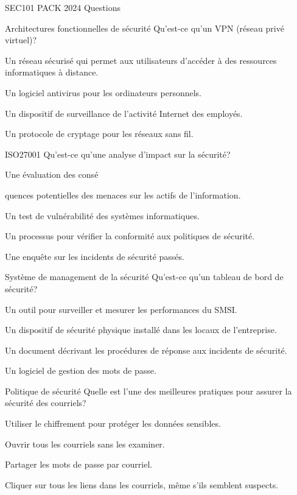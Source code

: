 \documentclass[12pt]{article}
\begin{document}
\begin{quiz}{SEC101 PACK 2024 Questions}
\begin{multi}[points=1]{Architectures fonctionnelles de sécurité}
Qu'est-ce qu'un VPN (réseau privé virtuel)?
\item* Un réseau sécurisé qui permet aux utilisateurs d'accéder à des ressources informatiques à distance.
\item Un logiciel antivirus pour les ordinateurs personnels.
\item Un dispositif de surveillance de l'activité Internet des employés.
\item Un protocole de cryptage pour les réseaux sans fil.
\end{multi}

\begin{multi}[points=1]{ISO27001}
Qu'est-ce qu'une analyse d'impact sur la sécurité?
\item* Une évaluation des consé

quences potentielles des menaces sur les actifs de l'information.
\item Un test de vulnérabilité des systèmes informatiques.
\item Un processus pour vérifier la conformité aux politiques de sécurité.
\item Une enquête sur les incidents de sécurité passés.
\end{multi}

\begin{multi}[points=1]{Système de management de la sécurité}
Qu'est-ce qu'un tableau de bord de sécurité?
\item* Un outil pour surveiller et mesurer les performances du SMSI.
\item Un dispositif de sécurité physique installé dans les locaux de l'entreprise.
\item Un document décrivant les procédures de réponse aux incidents de sécurité.
\item Un logiciel de gestion des mots de passe.
\end{multi}

\begin{multi}[points=1]{Politique de sécurité}
Quelle est l'une des meilleures pratiques pour assurer la sécurité des courriels?
\item* Utiliser le chiffrement pour protéger les données sensibles.
\item Ouvrir tous les courriels sans les examiner.
\item Partager les mots de passe par courriel.
\item Cliquer sur tous les liens dans les courriels, même s'ils semblent suspects.
\end{multi}


\end{quiz}
\end{document}
